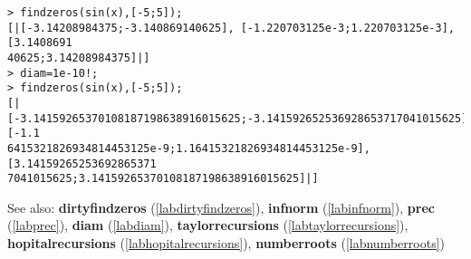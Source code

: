 \begin{center}\begin{minipage}{15cm}\begin{Verbatim}[frame=single]
> findzeros(sin(x),[-5;5]);
[|[-3.14208984375;-3.140869140625], [-1.220703125e-3;1.220703125e-3], [3.1408691
40625;3.14208984375]|]
> diam=1e-10!;
> findzeros(sin(x),[-5;5]);
[|[-3.14159265370108187198638916015625;-3.141592652536928653717041015625], [-1.1
6415321826934814453125e-9;1.16415321826934814453125e-9], [3.14159265253692865371
7041015625;3.14159265370108187198638916015625]|]
\end{Verbatim}
\end{minipage}\end{center}
See also: \textbf{dirtyfindzeros} (\ref{labdirtyfindzeros}), \textbf{infnorm} (\ref{labinfnorm}), \textbf{prec} (\ref{labprec}), \textbf{diam} (\ref{labdiam}), \textbf{taylorrecursions} (\ref{labtaylorrecursions}), \textbf{hopitalrecursions} (\ref{labhopitalrecursions}), \textbf{numberroots} (\ref{labnumberroots})
